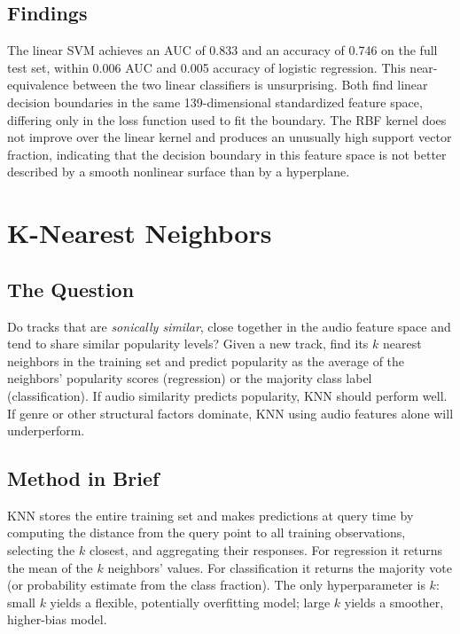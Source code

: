 \documentclass[12pt, oneside]{book}
\begin{document}
\section{Findings}
 
The linear SVM achieves an AUC of 0.833 and an accuracy of 0.746 on the full test set, within 0.006 AUC and 0.005 accuracy of logistic regression. This near-equivalence between the two linear classifiers is unsurprising. Both find linear decision boundaries in the same 139-dimensional standardized feature space, differing only in the loss function used to fit the boundary. The RBF kernel does not improve over the linear kernel and produces an unusually high support vector fraction, indicating that the decision boundary in this feature space is not better described by a smooth nonlinear surface than by a hyperplane.
 
\chapter{K-Nearest Neighbors}
 
\section{The Question}
 
Do tracks that are \textit{sonically similar}, close together in the audio feature space and tend to share similar popularity levels? Given a new track, find its $k$ nearest neighbors in the training set and predict popularity as the average of the neighbors' popularity scores (regression) or the majority class label (classification). If audio similarity predicts popularity, KNN should perform well. If genre or other structural factors dominate, KNN using audio features alone will underperform.
 
\section{Method in Brief}
 
KNN stores the entire training set and makes predictions at query time by computing the distance from the query point to all training observations, selecting the $k$ closest, and aggregating their responses. For regression it returns the mean of the $k$ neighbors' values. For classification it returns the majority vote (or probability estimate from the class fraction). The only hyperparameter is $k$: small $k$ yields a flexible, potentially overfitting model; large $k$ yields a smoother, higher-bias model.
 
\end{document}
